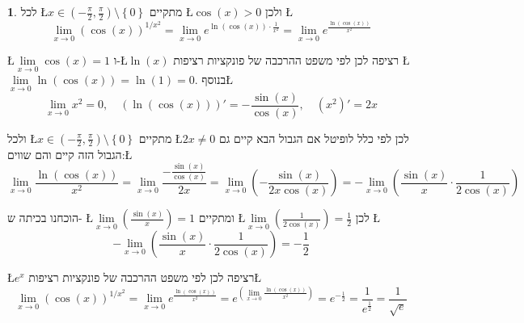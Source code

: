 \documentclass[english,hebrew]{article}
\theoremstyle{plain}
\theoremstyle{definition}
\theoremstyle{definition}
\newtheorem*{sol*}{\protect\solutionname}
\providecommand{\solutionname}{פתרון}
\begin{document}
\begin{sol*}
לכל \L{$x\in\left(-\frac{\pi}{2},\frac{\pi}{2}\right)\setminus\left\{ 0\right\} $}
מתקיים \L{$\cos(x)>0$} ולכן \L{%
\[
\underset{x\to0}{\lim}\left(\cos(x)\right)^{1/x^{2}}=\underset{x\to0}{\lim}e^{\ln\left(\cos(x)\right)\cdot\frac{1}{x^{2}}}=\underset{x\to0}{\lim}e^{\frac{\ln\left(\cos(x)\right)}{x^{2}}}
\]
}%

\L{$\underset{x\to0}{\lim}\cos(x)=1$} ו-\L{$\ln(x)$} רציפה לכן לפי
משפט ההרכבה של פונקציות רציפות \L{$\underset{x\to0}{\lim}\ln\left(\cos\left(x\right)\right)=\ln\left(1\right)=0$}.
בנוסף\L{%
\[
\underset{x\to0}{\lim}x^{2}=0,\quad\left(\ln\left(\cos\left(x\right)\right)\right)'=-\frac{\sin(x)}{\cos(x)},\quad\left(x^{2}\right)'=2x
\]
}%

ולכל \L{$x\in\left(-\frac{\pi}{2},\frac{\pi}{2}\right)\setminus\left\{ 0\right\} $}
מתקיים \L{$2x\ne0$} לכן לפי כלל לופיטל אם הגבול הבא קיים גם הגבול
הזה קיים והם שווים:\L{%
\[
\underset{x\to0}{\lim}\frac{\ln\left(\cos(x)\right)}{x^{2}}=\underset{x\to0}{\lim}\frac{-\frac{\sin(x)}{\cos(x)}}{2x}=\underset{x\to0}{\lim}\left(-\frac{\sin(x)}{2x\cos(x)}\right)=-\underset{x\to0}{\lim}\left(\frac{\sin(x)}{x}\cdot\frac{1}{2\cos(x)}\right)
\]
}%

הוכחנו בכיתה ש- \L{$\underset{x\to0}{\lim}\left(\frac{\sin(x)}{x}\right)=1$}
ומתקיים \L{$\underset{x\to0}{\lim}\left(\frac{1}{2\cos(x)}\right)=\frac{1}{2}$}
לכן \L{%
\[
-\underset{x\to0}{\lim}\left(\frac{\sin(x)}{x}\cdot\frac{1}{2\cos(x)}\right)=-\frac{1}{2}
\]
}%

\L{$e^{x}$} רציפה לכן לפי משפט ההרכבה של פונקציות רציפות\L{%
\[
\underset{x\to0}{\lim}\left(\cos(x)\right)^{1/x^{2}}=\underset{x\to0}{\lim}e^{\frac{\ln\left(\cos(x)\right)}{x^{2}}}=e^{\left(\underset{x\to0}{\lim}\frac{\ln\left(\cos(x)\right)}{x^{2}}\right)}=e^{-\frac{1}{2}}=\frac{1}{e^{\frac{1}{2}}}=\frac{1}{\sqrt{e}}
\]
}%
\end{sol*}
\end{document}
